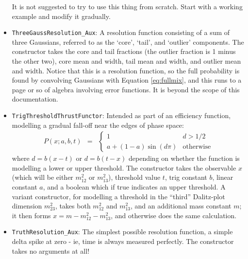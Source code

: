 \documentclass[12pt,pdflatex]{article}
\begin{document}
\begin{itemize}
It is not suggested to try to use this thing from scratch. Start with a working
example and modify it gradually. 
\item \texttt{ThreeGaussResolution\_Aux}: A resolution function
consisting of a sum of three Gaussians, referred to as the `core', 
`tail', and `outlier' components. The constructor takes the core and
tail fractions (the outlier fraction is 1 minus the other two), core
mean and width, tail mean and width, and outlier mean and width. Notice
that this is a resolution function, so the full probability is found by
convolving Gaussians with Equation \ref{eq:fullmix}, and this runs to a page
or so of algebra involving error functions. It is beyond the scope of this
documentation. 
\item \texttt{TrigThresholdThrustFunctor}: Intended as part of an efficiency
function, modelling a gradual fall-off near the edges of phase space:
\begin{eqnarray}
P(x;a,b,t) &=& \left\{\begin{matrix}
1 & d > 1/2 \\
a + (1-a) \sin(d\pi) & \mathrm{otherwise}
\end{matrix}
\right. 
\end{eqnarray}
where $d=b(x-t)$ or $d=b(t-x)$ depending on whether the function is modelling
a lower or upper threshold. The constructor takes the observable $x$ 
(which will be either $m^2_{12}$ or $m^2_{13}$), 
threshold value $t$, trig constant $b$, linear constant $a$, and a boolean
which if true indicates an upper threshold. A variant
constructor, for modelling a threshold in the ``third'' Dalitz-plot dimension
$m^2_{23}$, takes both $m^2_{12}$ and $m^2_{13}$, and an additional mass constant $m$;
it then forms $x = m - m^2_{12} - m^2_{13}$, and otherwise does the same calculation. 
\item \texttt{TruthResolution\_Aux}: The simplest possible resolution
function, a simple delta spike at zero - ie, time is always measured
perfectly. The constructor takes no arguments at all! 
\end{itemize}
\end{document}

